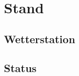 \documentclass[12pt,a4paper]{article}
\begin{document}
\section{Stand}
\subsection{Wetterstation}
\subsection{Status}


%
\end{document}
